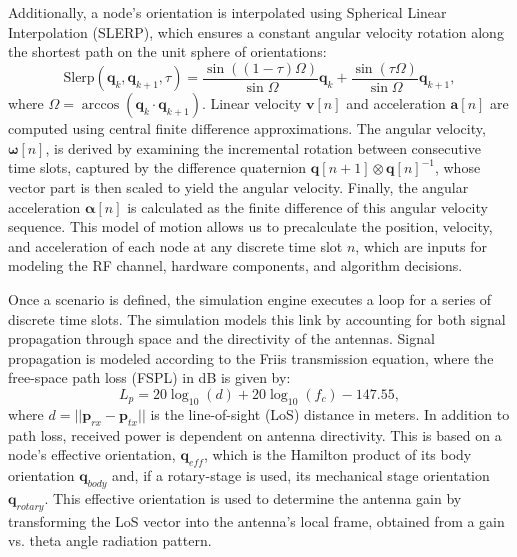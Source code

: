\documentclass[fleqn,10pt]{wlscirep}
\begin{document}
Additionally, a node's orientation is interpolated using Spherical Linear Interpolation (SLERP), which ensures a constant angular velocity rotation along the shortest path on the unit sphere of orientations:
\begin{equation}
    \text{Slerp}(\mathbf{q}_k, \mathbf{q}_{k+1}, \tau) = \frac{\sin((1-\tau)\Omega)}{\sin\Omega}\mathbf{q}_k + \frac{\sin(\tau\Omega)}{\sin\Omega}\mathbf{q}_{k+1},
\end{equation}
where $\Omega = \arccos(\mathbf{q}_k \cdot \mathbf{q}_{k+1})$. Linear velocity $\mathbf{v}[n]$ and acceleration $\mathbf{a}[n]$ are computed using central finite difference approximations. The angular velocity, $\boldsymbol{\omega}[n]$, is derived by examining the incremental rotation between consecutive time slots, captured by the difference quaternion $\mathbf{q}[n+1] \otimes \mathbf{q}[n]^{-1}$, whose vector part is then scaled to yield the angular velocity. Finally, the angular acceleration $\boldsymbol{\alpha}[n]$ is calculated as the finite difference of this angular velocity sequence.  This model of motion allows us to precalculate the position, velocity, and acceleration of each node at any discrete time slot $n$, which are inputs for modeling the RF channel, hardware components, and algorithm decisions.

Once a scenario is defined, the simulation engine executes a loop for a series of discrete time slots. The simulation models this link by accounting for both signal propagation through space and the directivity of the antennas. Signal propagation is modeled according to the Friis transmission equation, where the free-space path loss (FSPL) in dB is given by:
\begin{equation}
    L_{p} = 20 \log_{10}(d) + 20 \log_{10}(f_c) - 147.55,
\end{equation}
where $d = ||\mathbf{p}_{rx} - \mathbf{p}_{tx}||$ is the line-of-sight (LoS) distance in meters. In addition to path loss, received power is dependent on antenna directivity. This is based on a node's effective orientation, $\mathbf{q}_{eff}$, which is the Hamilton product of its body orientation $\mathbf{q}_{body}$ and, if a rotary-stage is used, its mechanical stage orientation $\mathbf{q}_{rotary}$. This effective orientation is used to determine the antenna gain by transforming the LoS vector into the antenna's local frame, obtained from a gain vs. theta angle radiation pattern.
\end{document}
